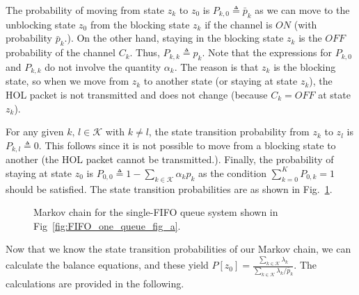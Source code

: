 \documentclass[conference]{IEEEtran}
\newcommand{\Kset}{\mathcal{K}}
\begin{document}
The probability of moving from state $z_k$ to $z_0$ is $P_{k,0} \triangleq \bar{p}_{k}$ as we can move to the unblocking state $z_0$ from the blocking state $z_k$ if the channel is $ON$ (with probability $\bar{p}_{k}$.). On the other hand, staying in the blocking state $z_k$ is the $OFF$ probability of the channel $C_{k}$. Thus, $P_{k,k} \triangleq p_{k}$. Note that the expressions for $P_{k,0}$ and $P_{k,k}$ do not involve the quantity $\alpha_{k}$. The reason is that $z_k$ is the blocking state, so when we move from $z_k$ to another state (or staying at state $z_k$), the HOL packet is not transmitted and does not change (because $C_{k}=OFF$ at state $z_k$).

For any given $k,\,l \in \Kset$ with $k \neq l$, the state transition probability from $z_{k}$ to $z_{l}$ is $P_{k,l} \triangleq 0$. This follows since it is not possible to move from a blocking state to another (the HOL packet cannot be transmitted.). Finally, the probability of staying at state $z_0$ is $P_{0,0} \triangleq 1 - \sum_{k \in \Kset} \alpha_{k}p_{k}$ as the condition $\sum_{k=0}^{K} P_{0,k}=1$ should be satisfied. The state transition probabilities are as shown in Fig.~\ref{fig:markov_chain_single_fifo}.

\begin{figure}
\vspace{5pt}
\centering
{}
\caption{Markov chain for the single-FIFO queue system shown in Fig~\ref{fig:FIFO_one_queue_fig_a}.}
\label{fig:markov_chain_single_fifo}
\vspace{-5pt}
\end{figure}

Now that we know the state transition probabilities of our Markov chain, we can calculate the balance equations, and these yield $P[z_0] = \frac{\sum_{k \in \Kset} \lambda_{k} }{\sum_{k \in \Kset} \lambda_{k}/\bar{p}_{k}}$. The calculations are provided in the following. 
\end{document}
